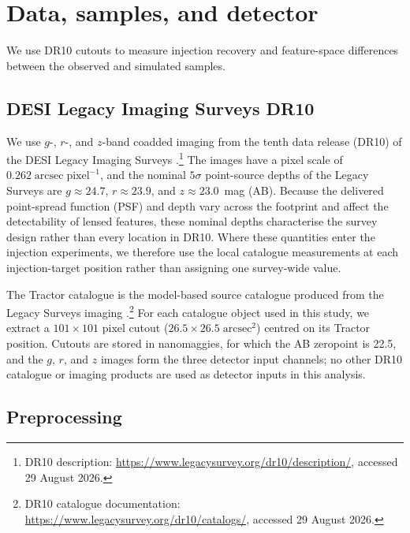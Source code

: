 \section{Data, samples, and detector}
\label{sec:data_detector}

We use DR10 cutouts to measure injection recovery and feature-space
differences between the observed and simulated samples.

\subsection{DESI Legacy Imaging Surveys DR10}
\label{sec:dr10_data}

We use $g$-, $r$-, and $z$-band coadded imaging from the tenth data release
(DR10) of the DESI Legacy Imaging Surveys \citep{Dey2019}.\footnote{DR10
description: \url{https://www.legacysurvey.org/dr10/description/}, accessed
29 August 2026.} The images have a
pixel scale of $0.262\;\mathrm{arcsec\;pixel^{-1}}$, and the nominal
$5\sigma$ point-source depths of the Legacy Surveys are $g \approx 24.7$,
$r \approx 23.9$, and $z \approx 23.0$~mag (AB). Because the delivered
point-spread function (PSF) and depth vary across the footprint and affect the
detectability of lensed features, these nominal depths characterise the survey
design rather than every location in DR10. Where these quantities enter the
injection experiments, we therefore use the local catalogue measurements at
each injection-target position rather than assigning one survey-wide value.

The Tractor catalogue is the model-based source catalogue produced from the
Legacy Surveys imaging \citep{Lang2016,Dey2019}.\footnote{DR10 catalogue
documentation: \url{https://www.legacysurvey.org/dr10/catalogs/}, accessed
29 August 2026.} For each catalogue object used in this
study, we extract a $101 \times 101$ pixel cutout
($26.5 \times 26.5\;\mathrm{arcsec}^{2}$) centred on its Tractor position.
Cutouts are stored in nanomaggies, for which the AB zeropoint is 22.5, and the
$g$, $r$, and $z$ images form the three detector input channels; no other DR10
catalogue or imaging products are used as detector inputs in this analysis.

\subsection{Preprocessing}
\label{sec:preprocessing}

